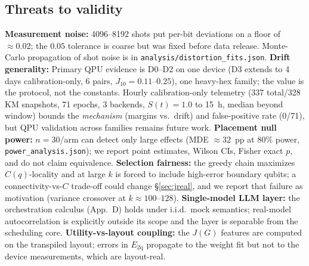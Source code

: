 \documentclass[journal,10pt,twocolumn]{IEEEtran}
\begin{document}
\subsection{Threats to validity}
\textbf{Measurement noise:} 4096--8192 shots put per-bit deviations on a floor of $\approx0.02$; the $0.05$
tolerance is coarse but was fixed before data release. Monte-Carlo propagation of shot noise is in
\texttt{analysis/distortion\_fits.json}. \textbf{Drift generality:} Primary QPU evidence is D0--D2 on one
device (D3 extends to 4 days calibration-only, 6 pairs, $J_{10}{=}0.11$--$0.25$), one heavy-hex family; the value is the protocol, not the constants. Hourly calibration-only telemetry
(337 total/328 KM snapshots, 71 epochs, 3 backends, $S(t){=}1.0$ to 15~h, median beyond window) bounds the \emph{mechanism} (margins vs.\ drift) and
false-positive rate (0/71), but QPU validation across families remains future work. \textbf{Placement null power:} $n{=}30$/arm can detect only large effects (MDE
$\approx32$~pp at $80\%$ power, \texttt{power\_analysis.json}); we report point estimates, Wilson CIs, Fisher
exact $p$, and do not claim equivalence. \textbf{Selection fairness:} the greedy chain maximizes $C(q)$-locality
and at large $k$ is forced to include high-error boundary qubits; a connectivity-vs-$C$ trade-off could change
\S\ref{sec:jreal}, and we report that failure as motivation (variance crossover at $k\approx100$--$128$).
\textbf{Single-model LLM layer:} the orchestration calculus (App.~D) holds under i.i.d.\ mock semantics;
real-model autocorrelation is explicitly outside its scope and the layer is separable from the scheduling core.
\textbf{Utility-vs-layout coupling:} the $J(G)$ features are computed on the transpiled layout; errors in
$E_{\mathrm{2q}}$ propagate to the weight fit but not to the device measurements, which are layout-real.
\end{document}
